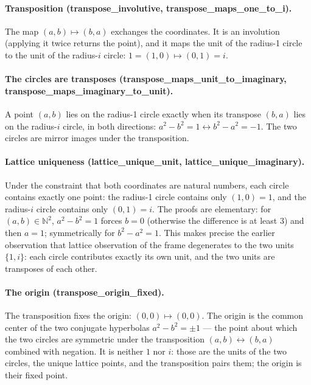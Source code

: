 \documentclass[sigplan,10pt,anonymous,review]{acmart}
\begin{document}
\paragraph{Transposition (transpose\_involutive, transpose\_maps\_one\_to\_i).}
The map $(a,b) \mapsto (b,a)$ exchanges the coordinates. It is an
involution (applying it twice returns the point), and it maps the unit
of the radius-1 circle to the unit of the radius-$i$ circle:
$1 = (1,0) \mapsto (0,1) = i$.

\paragraph{The circles are transposes (transpose\_maps\_unit\_to\_imaginary,
transpose\_maps\_imaginary\_to\_unit).} A point $(a,b)$ lies on the
radius-1 circle exactly when its transpose $(b,a)$ lies on the
radius-$i$ circle, in both directions:
$a^2 - b^2 = 1 \leftrightarrow b^2 - a^2 = -1$. The two circles are
mirror images under the transposition.

\paragraph{Lattice uniqueness (lattice\_unique\_unit,
lattice\_unique\_imaginary).} Under the constraint that both
coordinates are natural numbers, each circle contains exactly one
point: the radius-1 circle contains only $(1,0) = 1$, and the radius-$i$
circle contains only $(0,1) = i$. The proofs are elementary: for
$(a,b) \in \mathbb{N}^2$, $a^2 - b^2 = 1$ forces $b = 0$ (otherwise the
difference is at least $3$) and then $a = 1$; symmetrically for
$b^2 - a^2 = 1$. This makes precise the earlier observation that
lattice observation of the frame degenerates to the two units
$\{1, i\}$: each circle contributes exactly its own unit, and the two
units are transposes of each other.

\paragraph{The origin (transpose\_origin\_fixed).} The transposition
fixes the origin: $(0,0) \mapsto (0,0)$. The origin is the common
center of the two conjugate hyperbolas $a^2 - b^2 = \pm 1$ --- the
point about which the two circles are symmetric under the transposition
$(a,b) \leftrightarrow (b,a)$ combined with negation. It is neither $1$
nor $i$: those are the units of the two circles, the unique lattice
points, and the transposition pairs them; the origin is their fixed
point.
\end{document}
